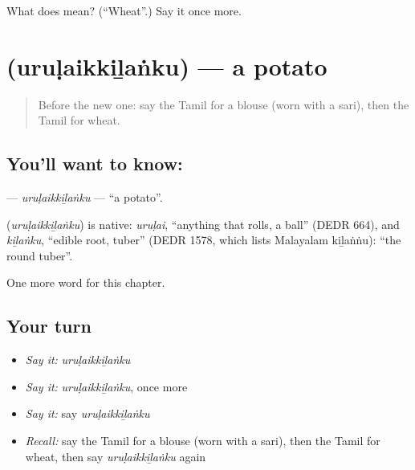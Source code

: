 \begin{tcolorbox}[breakable,colback=teal!4,colframe=teal!35!black,title={Before you move on}]
What does  mean? (\textquotedblleft{}Wheat\textquotedblright{}.) Say it once more.
\end{tcolorbox}
\section[\texorpdfstring{\ta{உருளைக்கிழங்கு} (uruḷaikkiḻaṅku)}{உருளைக்கிழங்கு (uruḷaikkiḻaṅku)}]{ (uruḷaikkiḻaṅku) — a potato}

\label{lesson:TA-C243-urulaikkilanku}



\begin{quote}
Before the new one: say the Tamil for a blouse (worn with a sari), then the Tamil for wheat.
\end{quote}

\subsection*{You'll want to know: }
\textbf{} — \emph{uruḷaikkiḻaṅku} — \textquotedblleft{}a potato\textquotedblright{}.

\begin{cousinweb}
\textbf{} (\emph{uruḷaikkiḻaṅku}) is native: \emph{uruḷai}, \textquotedblleft{}anything that rolls, a ball\textquotedblright{} (DEDR 664), and \emph{kiḻaṅku}, \textquotedblleft{}edible root, tuber\textquotedblright{} (DEDR 1578, which lists Malayalam kiḻaṅṅu): \textquotedblleft{}the round tuber\textquotedblright{}.
\end{cousinweb}

\begin{grammarlens}[title={What you've built}]
One more word for this chapter.
\end{grammarlens}

\subsection*{Your turn}
\begin{itemize}
\raggedright
  \item \emph{Say it:} \emph{uruḷaikkiḻaṅku}
  \item \emph{Say it:} \emph{uruḷaikkiḻaṅku}, once more
  \item \emph{Say it:} say \emph{uruḷaikkiḻaṅku}
  \item \emph{Recall:} say the Tamil for a blouse (worn with a sari), then the Tamil for wheat, then say \emph{uruḷaikkiḻaṅku} again
\end{itemize}

